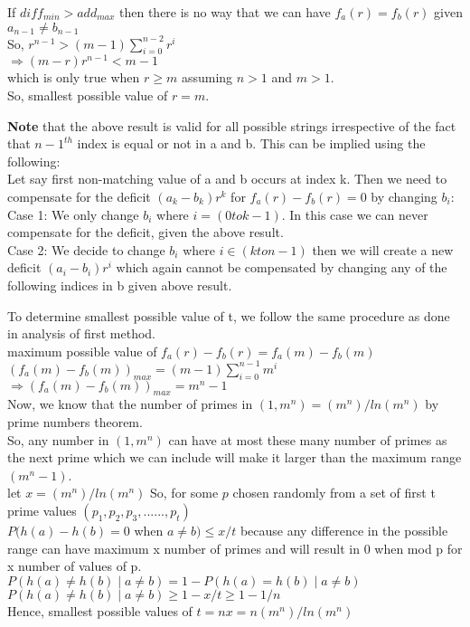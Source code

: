 \documentclass[11pt]{article}
\begin{document}
If $diff_{min} > add_{max}$ then there is no way that we can have $f_a(r) = f_b(r)$ given $a_{n-1} \neq b_{n-1}$ \\
So, $r^{n-1} > (m-1) \sum_{i=0}^{n-2}r^i$ \\
$\Rightarrow (m-r)r^{n-1} < m-1$ \\
which is only true when $r \geq m$ assuming $n > 1$ and $m > 1$.\\
So, smallest possible value of $r = m$.

\textbf{Note} that the above result is valid for all possible strings irrespective of the fact that ${n-1}^{th}$ index is equal or not 
in a and b. This can be implied using the following: \\
Let say first non-matching value of a and b  occurs at index k. Then we need to compensate for the deficit  $(a_k - b_k) r^k$ for 
$f_a(r) - f_b(r) = 0$ by changing $b_i$: \\
Case 1: We only change $b_i$ where $i = (0 to k-1)$. In this case we  can never compensate for the deficit, given the above result.\\
Case 2: We decide to change $b_i$ where $ i \in (k to n-1)$ then we will create a new deficit $(a_i-b_i)r^i$ which again cannot be 
compensated by changing any of the following indices in b given above result.

To determine smallest possible value of t, we follow the same procedure as done in analysis of first method.\\
maximum possible value of $f_a(r) - f_b(r) = f_a(m) - f_b(m)$ \\
$(f_a(m) - f_b(m))_{max} = (m-1) \sum_{i=0}^{n-1} m^i$ \\
$ \Rightarrow  (f_a(m) - f_b(m))_{max} = m^n-1$ \\
Now, we know that the number of primes in $(1, m^n) = (m^n)/ln(m^n)$ by prime numbers theorem.\\
So, any number in $(1, m^n)$ can have at most these many  number of primes as the next prime which we can include will make
it larger than the maximum range $(m^n-1)$.\\
let $x =  (m^n)/ln(m^n)$
So, for some $p$ chosen randomly from a set of first t prime values $(p_1,p_2,p_3,......,p_t)$ \\
$P(h(a) - h(b) = 0$ when $a \neq b) \leq x/t$ because any difference in the possible range can have maximum x number of primes
and will result in 0 when mod p for x number of values of p.\\
$P(h(a) \neq h(b) \mid a \neq b) = 1 - P(h(a) = h(b) \mid a \neq b)$ \\
$P(h(a) \neq h(b) \mid a \neq b) \geq 1- x/t  \geq 1 - 1/n$ \\
Hence, smallest possible values of $t = nx = n(m^n)/ln(m^n)$ \\
\end{document}
